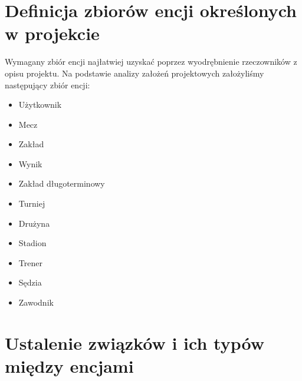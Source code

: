 \documentclass{mwrep}
\begin{document}
\section{Definicja zbiorów encji określonych w projekcie}
Wymagany zbiór encji najłatwiej uzyskać poprzez wyodrębnienie rzeczowników z opisu projektu.
Na podstawie analizy założeń projektowych założyliśmy następujący zbiór encji:

\begin{itemize}
	\item Użytkownik
	\item Mecz
	\item Zakład
	\item Wynik
	\item Zakład długoterminowy
	\item Turniej
	\item Drużyna
	\item Stadion
	\item Trener
	\item Sędzia
	\item Zawodnik
\end{itemize}
 
\vspace{1cm}
\section{Ustalenie związków i ich typów między encjami}
\end{document}
